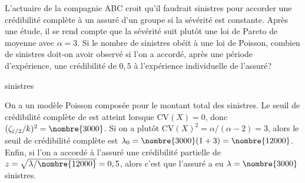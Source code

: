 \begin{exercice}
  L'actuaire de la compagnie ABC croit qu'il faudrait 
  sinistres pour accorder une crédibilité complète à un assuré d'un
  groupe si la sévérité est constante.  Après une étude, il se rend
  compte que la sévérité suit plutôt une loi de Pareto de moyenne
   avec $\alpha = 3$. Si le nombre de sinistres obéit à
  une loi de Poisson, combien de sinistres doit-on avoir observé si
  l'on a accordé, après une période d'expérience, une crédibilité de
  $0,5$ à l'expérience individuelle de l'assuré?
  \begin{rep}
     sinistres
  \end{rep}
  \begin{sol}
    On a un modèle Poisson composée pour le montant total des
    sinistres. Le seuil de crédibilité complète de  est
    atteint lorsque $\mathrm{CV}(X) = 0$, donc
    $(\zeta_{\varepsilon/2}/k)^2 = \nombre{3000}$. Si on a plutôt
    $\mathrm{CV}(X)^2 = \alpha/(\alpha - 2) = 3$, alors le seuil de
    crédibilité complète est $\lambda_0 = \nombre{3000}(1 + 3) =
    \nombre{12000}$. Enfin, si l'on a accordé à l'assuré une
    crédibilité partielle de $z = \sqrt{\lambda/\nombre{12000}} = 0,5$,
    alors c'est que l'assuré a eu $\lambda = \nombre{3000}$
    sinistres.
  \end{sol}
\end{exercice}

